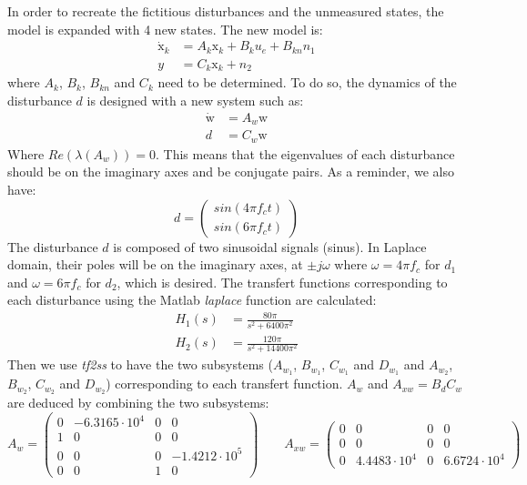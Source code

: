 In order to recreate the fictitious disturbances and the unmeasured states, the model is expanded with 4 new states. The new model is:
\begin{align*}
\dot{\text{x}}_k &= A_k \text{x}_k + B_k u_e + B_{kn} n_1 \\
y &= C_k \text{x}_k + n_2
\end{align*}
where $A_k$, $B_k$, $B_{kn}$ and $C_k$ need to be determined.
To do so, the dynamics of the disturbance $d$ is designed with a new system such as:
\begin{align*}
\dot{\text{w}} &= A_w\text{w} \\
d &= C_w \text{w}
\end{align*}
Where $Re(\lambda (A_w)) = 0$. This means that the eigenvalues of each disturbance should be on the imaginary axes and be conjugate pairs. As a reminder, we also have:
\[
  d = \begin{pmatrix}
   sin(4\pi f_c t)\\
   sin(6\pi f_c t)
\end{pmatrix}
\]
The disturbance $d$ is composed of two sinusoidal signals (sinus). In Laplace domain, their poles will be on the imaginary axes, at $\pm j\omega$ where $\omega = 4\pi f_c$ for $d_1$ and $\omega = 6\pi f_c$ for $d_2$, which is desired. 
The transfert functions corresponding to each disturbance using the Matlab \textit{laplace} function are calculated:
\begin{align*}
H_1(s) &= \frac{80\pi}{s^2 + 6400\pi^2}\\
H_2(s) &= \frac{120\pi}{s^2 + 14400\pi^2}
\end{align*}
Then we use \textit{tf2ss} to have the two subsystems ($A_{w_1}$, $B_{w_1}$, $C_{w_1}$ and $D_{w_1}$ and $A_{w_2}$, $B_{w_2}$, $C_{w_2}$ and $D_{w_2}$) corresponding to each transfert function. $A_w$ and $A_{xw} = B_d C_w$ are deduced by combining the two subsystems:
\begin{equation*}
  A_w = \begin{pmatrix}
   0 & -6.3165 \cdot 10^4 & 0 & 0\\
   1 & 0 & 0 & 0\\
   0 & 0 & 0 & -1.4212 \cdot 10^5\\
   0 & 0 & 1 & 0
\end{pmatrix}
\qquad A_{xw} = \begin{pmatrix}
	0 & 0 & 0 & 0\\
	0 & 0 & 0 & 0\\
	0 & 4.4483 \cdot 10^4 & 0 & 6.6724 \cdot 10^4
\end{pmatrix}
\end{equation*}

